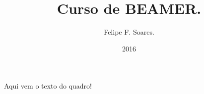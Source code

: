 \documentclass{beamer}
\title{Curso de BEAMER.}
\author{Felipe F. Soares.}
\institute{Universidade Federal do Ceará \\ ufc.br}
\date{2016}
\begin{document}
	\begin{frame}
		\titlepage
	\end{frame}
	
	\begin{frame}
		Aqui vem o texto do quadro!
	\end{frame}
\end{document}
